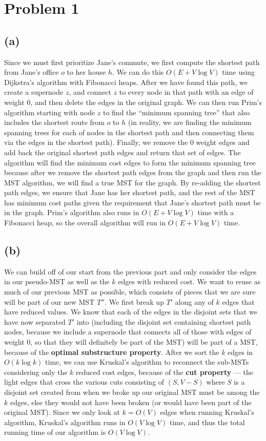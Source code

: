 \documentclass{6046}
\author{Matthew Feng}
\begin{document}
\section*{Problem 1}

\subsection*{(a)}
Since we must first prioritize Jane's commute, we first
compute the shortest path from Jane's office $o$ to her house $h$.
We can do this $O(E + V\log V)$ time using Dijkstra's algorithm
with Fibonacci heaps. After we have found this path,
we create a supernode $z$, and connect $z$ to every
node in that path with an edge of weight $0$, and then
delete the edges in the original graph. We can
then run Prim's algorithm starting with node $z$ to find
the ``minimum spanning tree'' that also includes the
shortest route from $o$ to $h$ (in reality, we 
are finding the minimum spanning trees for each of
nodes in the shortest path and then connecting them
via the edges in the shortest path). Finally, we remove
the $0$ weight edges and add back the original shortest path
edges and return that set of edges. The algorithm will
find the minimum cost edges to form the minimum spanning
tree because after we remove the shortest path edges
from the graph and then run the MST algorithm, we will
find a true MST for the graph. By re-adding the shortest path edges,
we ensure that Jane has her shortest path, and the rest of
the MST has minimum cost paths given the requirement that
Jane's shortest path must be in the graph. Prim's algorithm
also runs in $O(E + V\log V)$ time with a Fibonacci heap,
so the overall algorithm will run in $O(E + V\log V)$ time.

\subsection*{(b)}
We can build off of our start from the previous part and only
consider the edges in our pseudo-MST as well as the $k$ edges
with reduced cost. We want to reuse as much of our previous MST
as possible, which consists of pieces that we are sure will be
part of our new MST $T''$. We first break up $T'$ along any of
$k$ edges that have reduced values. We know that each of the
edges in the disjoint sets that we have now separated $T'$ into
(including the disjoint set containing shortest path nodes,
because we include a supernode that connects all of those with
edges of weight $0$, so that they will definitely be part of
the MST) will be part of a MST, because of the {\bf optimal substructure
property}. After we sort the $k$ edges in $O(k\log k)$ time, we can use
Kruskal's algorithm to reconnect the sub-MSTs considering only the
$k$ reduced cost edges, because of the {\bf cut
property} --- the light edges that cross the various cuts consisting
of $(S, V - S)$ where $S$ is a disjoint set created from when we broke
up our original MST must be among the $k$ edges, else they would
not have been broken (or would have been part of the original MST).
Since we only look at $k = O(V)$ edges when running Kruskal's algorithm, 
Kruskal's algorithm runs in $O(V\log V)$ time, and thus the total
running time of our algorithm is $O(V\log V)$.
\end{document}
